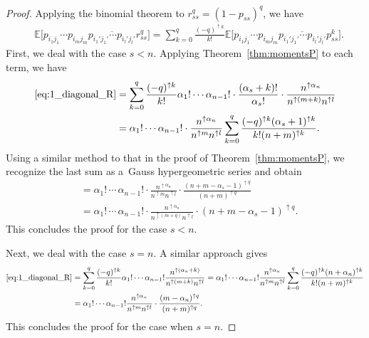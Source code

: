 \documentclass[10pt,a4paper]{amsart}
\numberwithin{equation}{section}
\theoremstyle{definition}
\begin{document}
\begin{proof}
Applying the binomial theorem to $r_{ss}^q=(1-p_{ss})^q$, we have
\begin{align}
&\mathbb{E} \bigl[p_{i_1 j_1} \cdots p_{i_m j_m} \overline{p_{i_1' j_1'} \cdots p_{i_l' j_l'}} r_{ss}^q\bigr] = \sum_{k=0}^q \frac{(-q)^{\uparrow k}}{k!} \mathbb{E} \bigl[p_{i_1 j_1} \cdots p_{i_m j_m} \overline{p_{i_1' j_1'} \cdots p_{i_l' j_l'}}p_{ss}^k \bigr]. \label{eq:1_diagonal_R}
\end{align}
First, we deal with the case $s <n$. Applying Theorem~\ref{thm:momentsP} to each term, we have
\begin{align*}
\begin{split}
\eqref{eq:1_diagonal_R} &=
 \sum_{k=0}^q \frac{(-q)^{\uparrow k}}{k!} \alpha_1! \cdots \alpha_{n-1}! \cdot \frac{(\alpha_s+ k)!}{\alpha_s!}
 \cdot \frac{n^{\uparrow \alpha_n}}{n^{\uparrow (m+k)} n^{\uparrow l}} \\
 &= \alpha_1! \cdots \alpha_{n-1}! \cdot \frac{n^{\uparrow \alpha_n}}{n^{\uparrow m} n^{\uparrow l}} \sum_{k=0}^q \frac{(-q)^{\uparrow k} (\alpha_s+1)^{\uparrow k}}{k! (n+m)^{\uparrow k}}.
 \end{split}
\end{align*}
Using a similar method to that in the proof of Theorem~\ref{thm:momentsP}, we recognize the last sum as a~Gauss hypergeometric series and obtain
\begin{align*}
 &= \alpha_1!\, \cdots \, \alpha_{n-1}! \cdot \frac{n^{\uparrow \alpha_n}}{n^{\uparrow m} n^{\uparrow l}} \cdot \frac{(n+m-\alpha_s-1)^{\uparrow q}}{(n+m)^{\uparrow q}} \\
 &= \alpha_1!\, \cdots \, \alpha_{n-1}! \cdot \frac{n^{\uparrow \alpha_n}}{n^{\uparrow (m+q)} n^{\uparrow l}} \cdot (n+m-\alpha_s-1)^{\uparrow q}.
\end{align*}
This concludes the proof for the case $s < n$.

Next, we deal with the case $s =n$. A similar approach gives
\begin{align*}
\eqref{eq:1_diagonal_R} &= \sum_{k=0}^q \frac{(-q)^{\uparrow k}}{k!} \alpha_1! \cdots \alpha_{n-1}! \frac{n^{\uparrow (\alpha_n +k)}}{n^{\uparrow (m+k)} n^{\uparrow l}}
 = \alpha_1! \cdots \alpha_{n-1}! \frac{n^{\uparrow \alpha_n}}{n^{\uparrow m} n^{\uparrow l}}\sum_{k=0}^q \frac{(-q)^{\uparrow k} (n+\alpha_n)^{\uparrow k}}{k! (n+m)^{\uparrow k}} \\
&=\alpha_1! \cdots \alpha_{n-1}! \frac{n^{\uparrow \alpha_n}}{n^{\uparrow m} n^{\uparrow l}} \cdot \frac{(m-\alpha_n)^{\uparrow q}}{(n+m)^{\uparrow q}}.
\end{align*}
This concludes the proof for the case when $s = n$.
\end{proof}
\end{document}
